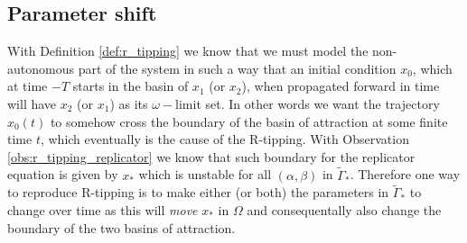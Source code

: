 \documentclass[../main.tex]{subfiles}
\begin{document}
\subsection{Parameter shift}\label{subsec:shift}

With Definition \ref{def:r_tipping} we know that we must model the non-autonomous part of the system in such a way that an initial condition $x_{0}$, which at time $-T$ starts in the basin of $x_{1}$ (or $x_{2}$), when propagated forward in time will have $x_{2}$ (or $x_{1}$) as its $\omega-$limit set.
In other words we want the trajectory $x_{0}(t)$ to somehow cross the boundary of the basin of attraction at some finite time $t$, which eventually is the cause of the R-tipping.
With Observation \ref{obs:r_tipping_replicator} we know that such boundary for the replicator equation is given by $x_{*}$ which is unstable for all $(\alpha,\beta)$ in $\tilde{\Gamma}_{*}$.
Therefore one way to reproduce R-tipping is to make either (or both) the parameters in $\tilde{\Gamma}_{*}$ to change over time as this will \textit{move} $x_{*}$ in $\Omega$ and consequentally also change the boundary of the two basins of attraction.



\end{document}
